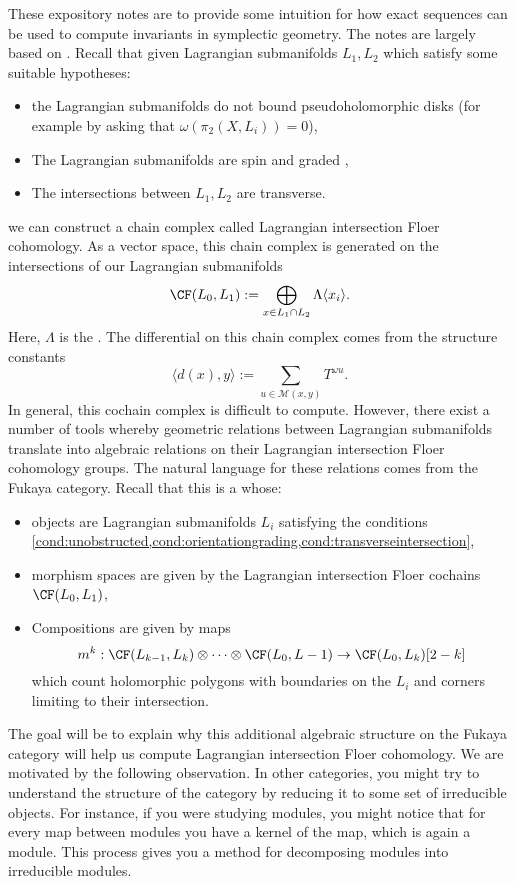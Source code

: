 
\begin{exposition}
These expository notes are to provide some intuition for how exact sequences can be used to compute invariants in symplectic geometry. The notes are largely based on \cite{auroux2014beginner}.
Recall that given Lagrangian submanifolds $L_1, L_2$ which satisfy some suitable hypotheses:
\begin{itemize}
    \item the Lagrangian submanifolds do not bound pseudoholomorphic disks (for example by asking that $\omega(\pi_2(X, L_i))=0$), \label{cond:unobstructed} 
    \item The Lagrangian submanifolds are spin and graded ,\label{cond:orientationgrading}
    \item The intersections between $L_1, L_2$ are transverse. \label{cond:transverseintersection}
\end{itemize}
we can construct a chain complex called Lagrangian intersection Floer cohomology. As a vector space, this chain complex is generated on the intersections of our Lagrangian submanifolds
\[\CF(L_0, L_1):= \bigoplus_{x\in L_1\cap L_2} \Lambda\langle x_i\rangle.\]
Here, $\Lambda$ is the .
The differential on this chain complex comes from the structure constants 
\[\langle d(x), y\rangle:=\sum_{u\in \mathcal M(x, y)} T^{\omega u}.\]
In general, this cochain complex is difficult to compute. However, there exist a number of tools whereby geometric relations between Lagrangian submanifolds translate into algebraic relations on their Lagrangian intersection Floer cohomology groups. The natural language for these relations comes from the Fukaya category. Recall that this is a  whose: 
\begin{itemize}
    \item objects are Lagrangian submanifolds $L_i$ satisfying the conditions \cref{cond:unobstructed,cond:orientationgrading,cond:transverseintersection},
    \item morphism spaces are given by the Lagrangian intersection Floer cochains $\CF(L_0, L_1)$,
    \item Compositions are given by maps 
    \[m^k: \CF(L_{k-1}, L_k)\otimes\cdots \otimes \CF(L_0, L-1)\to \CF(L_0, L_k)[2-k]\]
    which count holomorphic polygons with boundaries on the $L_i$ and corners limiting to their intersection. 
\end{itemize}
The goal will be to explain why this additional algebraic structure on the Fukaya category will help us compute Lagrangian intersection Floer cohomology.
We are motivated by the following observation.
In other categories, you might try to understand the structure of the category by reducing it to some set of irreducible objects. For instance, if you were studying modules, you might notice that for every map between modules you have a kernel of the map, which is again a module. This process gives you a method for decomposing modules into irreducible modules. 


\end{exposition}

